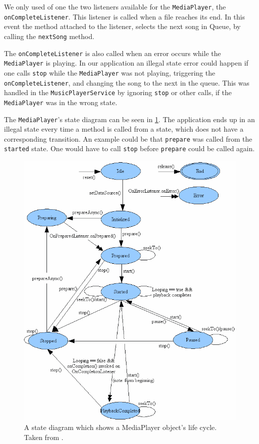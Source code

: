 We only used of one the two listeners available for the \texttt{MediaPlayer}, the \texttt{onCompleteListener}. This listener is called when a file reaches its end. In this event the method attached to the listener, selects the next song in Queue, by calling the \texttt{nextSong} method. 

The \texttt{onCompleteListener} is also called when an error occurs while the \texttt{MediaPlayer} is playing. In our application an illegal state error could happen if one calls \texttt{stop} while the \texttt{MediaPlayer} was not playing, triggering the \texttt{onCompleteListener}, and changing the song to the next in the queue. This was handled in the \texttt{MusicPlayerService} by ignoring \texttt{stop} or other calls, if the \texttt{MediaPlayer} was in the wrong state. 

The \texttt{MediaPlayer}'s state diagram can be seen in \cref{fig:medaiPlayerState}. The application ends up in an illegal state every time a method is called from a state, which does not have a corresponding transition. An example could be that \texttt{prepare} was called from the \texttt{started} state. One would have to call \texttt{stop} before \texttt{prepare} could be called again.

\begin{figure}[h!]
  \centering
    \includegraphics[width=\textwidth]{Images/mediaplayerStateDiagram.png}
  \caption{A state diagram which shows a MediaPlayer object's life cycle. Taken from \citet{android:MediaPlayer}.}
  \label{fig:medaiPlayerState}
\end{figure}
